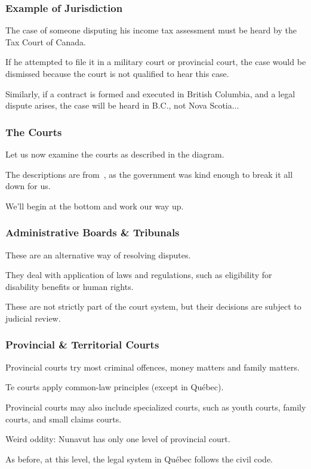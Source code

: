 \begin{frame}
\frametitle{Example of Jurisdiction}

The case of someone disputing his income tax assessment must be heard by the Tax Court of Canada.

If he attempted to file it in a military court or provincial court, the case would be dismissed because the court is not qualified to hear this case.

Similarly, if a contract is formed and executed in British Columbia, and a legal dispute arises, the case will be heard in B.C., not Nova Scotia...

\end{frame}



\begin{frame}
\frametitle{The Courts}

Let us now examine the courts as described in the diagram.

The descriptions are from~\cite{just07}, as the government was kind enough to break it all down for us. 

We'll begin at the bottom and work our way up.

\end{frame}




\begin{frame}
\frametitle{Administrative Boards \& Tribunals}

These are an alternative way of resolving disputes.

They deal with application of laws and regulations, such as eligibility for disability benefits or human rights.

These are not strictly part of the court system, but their decisions are subject to judicial review.

\end{frame}



\begin{frame}
\frametitle{Provincial \& Territorial Courts}

Provincial courts try most criminal offences, money matters and family matters. 

Te courts apply common-law principles (except in Qu\'ebec).

Provincial courts may also include specialized courts, such as youth courts, family courts, and small claims courts. 

Weird oddity: Nunavut has only one level of provincial court.

As before, at this level, the legal system in Qu\'ebec follows the civil code.

\end{frame}



